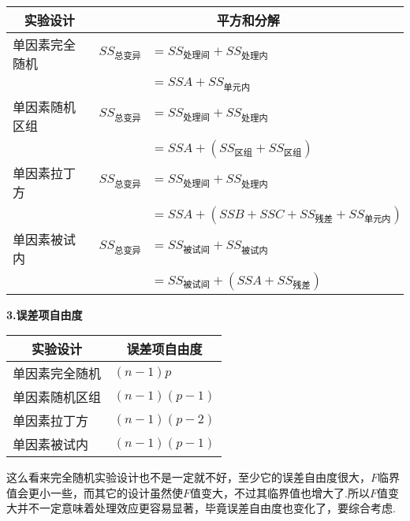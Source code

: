 {    \renewcommand\arraystretch{1.25}
    \begin{tabular}{rrl}
    \toprule
        \multicolumn{1}{c}{\textcolor[rgb]{ .208,  .204,  .161}{实验设计}} & \multicolumn{2}{c}{\textcolor[rgb]{ .208,  .204,  .161}{平方和分解}} \\
    \midrule
        \multicolumn{1}{l}{单因素完全随机} & \multicolumn{1}{l}{$SS_{\text{总变异}}$} & $=SS_{\text{处理间}}+SS_{\text{处理内}}$ \\
              &       & $=SSA+SS_{\text{单元内}}$ \\
        \multicolumn{1}{l}{单因素随机区组} & \multicolumn{1}{l}{$SS_{\text{总变异}}$} & $=SS_{\text{处理间}}+SS_{\text{处理内}}$ \\
              &       & $ =SSA + \left(  SS_{\text{区组}} + SS_{\text{区组}} \right) $ \\
        \multicolumn{1}{l}{单因素拉丁方} & \multicolumn{1}{l}{$SS_{\text{总变异}}$} & $=SS_{\text{处理间}}+SS_{\text{处理内}}$ \\
              &       & $=SSA+\left(  SSB +SSC +SS_{\text{残差}}+SS_{\text{单元内}} \right)$  \\
        \multicolumn{1}{l}{单因素被试内} & \multicolumn{1}{l}{$SS_{\text{总变异}}$} & $=SS_{\text{被试间}}+SS_{\text{被试内}}$ \\
              &       & $=SS_{\text{被试间}}+\left(  SSA + SS_{\text{残差}}  \right)$ \\
    \bottomrule
    \end{tabular}}
    
\textbf{3.误差项自由度}

{
    \renewcommand\arraystretch{1.25}
    \begin{tabular}{ll}
        \toprule
        \multicolumn{1}{c}{实验设计}          &    \multicolumn{1}{c}{误差项自由度}\\
        \midrule
        单因素完全随机    &    $(n-1)p$\\
        单因素随机区组    &    $(n-1)(p-1)$\\
        单因素拉丁方      &    $(n-1)(p-2)$\\
        单因素被试内      &    $(n-1)(p-1)$\\
        \bottomrule
    \end{tabular}    
}

这么看来完全随机实验设计也不是一定就不好，至少它的误差自由度很大，$F$临界值会更小一些，而其它的设计虽然使$F$值变大，不过其临界值也增大了.所以$F$值变大并不一定意味着处理效应更容易显著，毕竟误差自由度也变化了，要综合考虑.

